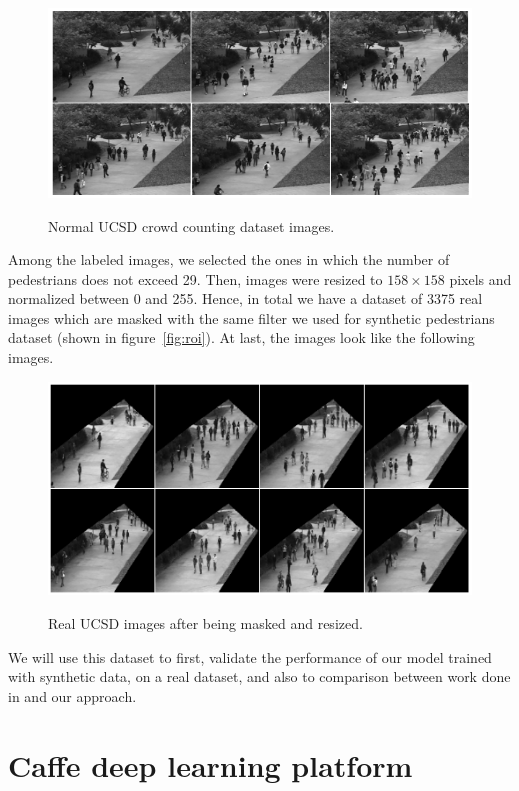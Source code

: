 \begin{figure}[H]
	\centering
	{\includegraphics[width=1\textwidth]{images/normalucsd}}
	\caption{Normal UCSD crowd counting dataset images.}
	\label{fig:ucsdorg}
\end{figure}

\indent Among the labeled images, we selected the ones in which the number of pedestrians does not exceed 29. Then, images were resized to  $158\times158$ pixels and normalized between 0 and 255. Hence, in total we have a dataset of 3375 real images which are masked with the same filter we used for synthetic pedestrians dataset (shown in figure~\ref{fig:roi}). At last, the images look like the following images.

\begin{figure}[H]
	\centering
	{\includegraphics[width=1\textwidth]{images/testucsd}}
	\caption{Real UCSD images after being masked and resized.}
	\label{fig:testucsd}
\end{figure}


\indent We will use this dataset to first, validate the performance of our model trained with synthetic data, on a real dataset, and also to comparison between work done in \cite{chan2008privacy} and our approach.



\section{Caffe deep learning platform}

